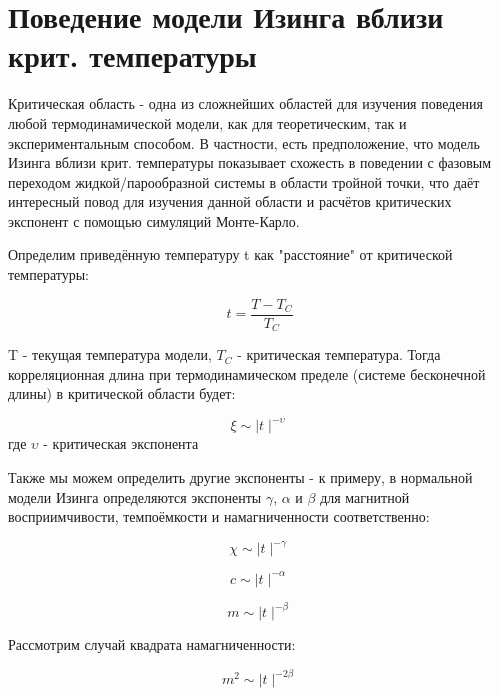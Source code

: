 \section{Поведение модели Изинга вблизи крит. температуры}

Критическая область - одна из сложнейших областей для изучения поведения любой термодинамической модели, как для теоретическим, так и экспериментальным способом. В частности, есть предположение, что модель Изинга вблизи крит. температуры показывает схожесть в поведении с фазовым переходом жидкой/парообразной системы в области тройной точки, что даёт интересный повод для изучения данной области и расчётов критических экспонент с помощью симуляций Монте-Карло.

Определим приведённую температуру t как "расстояние" от критической температуры:

\begin{equation} \label{eq:redTemp}
    t = \frac{T - T_{C}}{T_{C}}
\end{equation}

T - текущая температура модели, $T_{C}$ - критическая температура. Тогда корреляционная длина при термодинамическом пределе (системе бесконечной длины) в критической области будет:

\begin{equation}\label{eq:CorLen}
    \xi \sim \mid t \mid ^{-\upsilon} 
\end{equation}
где $\upsilon$ - критическая экспонента

Также мы можем определить другие экспоненты - к примеру, в нормальной модели Изинга определяются экспоненты $\gamma$, $\alpha$ и $\beta$ для магнитной восприимчивости, темпоёмкости и намагниченности соответственно:

\begin{equation}
    \chi \sim \mid t \mid ^{-\gamma}
\end{equation}

\begin{equation}
    c \sim \mid t \mid ^{-\alpha}
\end{equation}

\begin{equation}
    m \sim \mid t \mid ^{-\beta}
\end{equation}

Рассмотрим случай квадрата намагниченности:

\begin{equation}
    m^{2} \sim \mid t \mid ^{-2\beta}
\end{equation}

